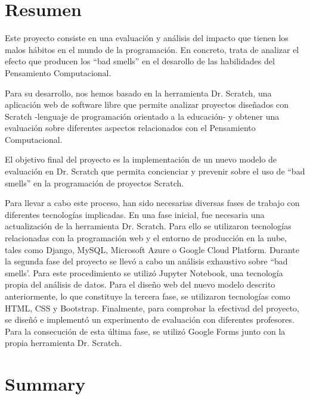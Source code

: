 

\chapter*{Resumen}

Este proyecto consiste en una evaluación y análisis del impacto que tienen los malos hábitos en el mundo de la programación. En concreto, trata de analizar el efecto que producen los ``bad smells'' en el desarollo de las habilidades del Pensamiento Computacional.  

Para su desarrollo, nos hemos basado en la herramienta Dr. Scratch, una aplicación web de software libre que permite analizar proyectos diseñados con Scratch -lenguaje de programación orientado a la educación- y obtener una evaluación sobre diferentes aspectos relacionados con el Pensamiento Computacional.

El objetivo final del proyecto es la implementación de un nuevo modelo de evaluación en Dr. Scratch que permita concienciar y prevenir sobre el uso de ``bad smells'' en la programación de proyectos Scratch. 

Para llevar a cabo este proceso, han sido necesarias diversas fases de trabajo con diferentes tecnologías implicadas. En una fase inicial, fue necesaria una actualización de la herramienta Dr. Scratch. Para ello se utilizaron tecnologías relacionadas con la programación web y el entorno de producción en la nube, tales como Django, MySQL, Microsoft Azure o Google Cloud Platform. Durante la segunda fase del proyecto se llevó a cabo un análisis exhaustivo sobre ``bad smells'. Para este procedimiento se utilizó Jupyter Notebook, una tecnología propia del análisis de datos. Para el diseño web del nuevo modelo descrito anteriormente, lo que constituye la tercera fase, se utilizaron tecnologías como HTML, CSS y Bootstrap. Finalmente, para comprobar la efectivad del proyecto, se diseñó e implementó un experimento de evaluación con diferentes profesores. Para la consecución de esta última fase, se utilizó Google Forms junto con la propia herramienta Dr. Scratch.



\chapter*{Summary}

